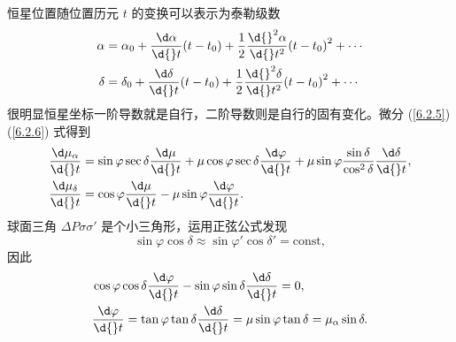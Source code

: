 \documentclass[UTF8, 12pt, a4paper, oneside, onecolumn, fontset=none]{ctexart}
\begin{document}
恒星位置随位置历元 $t$ 的变换可以表示为泰勒级数
\begin{align}
\alpha&=\alpha_{0}+\frac{\d\alpha}{\d{}t}\mleft(t-t_{0}\mright)+\frac{1}{2}\frac{\d{}^{2}\alpha}{\d{}t^{2}}\mleft(t-t_{0}\mright)^{2}+\cdots\\
\delta&=\delta_{0}+\frac{\d\delta}{\d{}t}\mleft(t-t_{0}\mright)+\frac{1}{2}\frac{\d{}^{2}\delta}{\d{}t^{2}}\mleft(t-t_{0}\mright)^{2}+\cdots
\end{align}
很明显恒星坐标一阶导数就是自行，二阶导数则是自行的固有变化。微分 (\ref{6.2.5})(\ref{6.2.6}) 式得到
\begin{align}
\frac{\d\mu_{\alpha}}{\d{}t}&=\sin{\varphi}\sec{\delta}\frac{\d\mu}{\d{}t}+\mu\cos{\varphi}\sec{\delta}\frac{\d\varphi}{\d{}t}+\mu\sin{\varphi}\frac{\sin{\delta}}{\cos^{2}{\delta}}\frac{\d\delta}{\d{}t},\label{6.2.13}\\
\frac{\d\mu_{\delta}}{\d{}t}&=\cos{\varphi}\frac{\d\mu}{\d{}t}-\mu\sin{\varphi}\frac{\d\varphi}{\d{}t}.\label{6.2.14}
\end{align}
球面三角 $\Delta{}P\sigma\sigma'$ 是个小三角形，运用正弦公式发现
\begin{equation}
\sin{\varphi}\cos{\delta}\approx\sin{\varphi'}\cos{\delta'}=\mathrm{const},
\end{equation}
因此
\begin{align}
&\cos{\varphi}\cos{\delta}\frac{\d\varphi}{\d{}t}-\sin{\varphi}\sin{\delta}\frac{\d\delta}{\d{}t}=0,\notag\\
&\frac{\d\varphi}{\d{}t}=\tan{\varphi}\tan{\delta}\frac{\d\delta}{\d{}t}=\mu\sin{\varphi}\tan{\delta}=\mu_{\alpha}\sin{\delta}.
\end{align}
\end{document}
